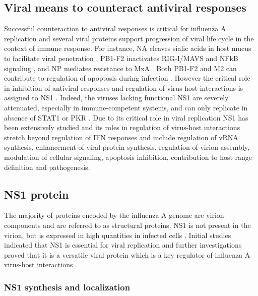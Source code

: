 		
	\subsection{Viral means to counteract antiviral responses}
	
	Successful counteraction to antiviral responses is critical for influenza A replication and several viral proteins support progression of viral life cycle in the context of immune response. For instance, \gls{NA} cleaves sialic acids in host mucus to facilitate viral penetration \parencite{Cohen2013}, \gls{PB1}-F2 inactivates \gls{RIG-I}/\gls{MAVS} and \gls{NFkB} signaling \parencite{Varga2011a, Dudek2011, Reis2013}, and \gls{NP} mediates resistance to \gls{MxA} \parencite{Dittmann2008}. Both \gls{PB1}-F2 and \gls{M2} can contribute to regulation of apoptosis during infection \parencite{Herold2012}. However the critical role in inhibition of antiviral responses and regulation of virus-host interactions is assigned to \gls{NS1} \parencite{Garcia-Sastre1998}. Indeed, the viruses lacking functional \gls{NS1} are severely attenuated, especially in immune-competent systems, and can only replicate in absence of \gls{STAT}1 or \gls{PKR} \parencite{Garcia-Sastre1998, Egorov1998, Donelan2003, Falcon2004}. Due to its critical role in viral replication \gls{NS1} has been extensively studied and its roles in regulation of virus-host interactions stretch beyond regulation of \gls{IFN} responses and include regulation of vRNA synthesis, enhancement of viral protein synthesis, regulation of virion assembly, modulation of cellular signaling, apoptosis inhibition, contribution to host range definition and pathogenesis. 
		
	\subsection{NS1 protein}
		
		The majority of proteins encoded by the influenza A genome are virion components and are referred to as structural proteins. \gls{NS1} is not present in the virion, but is expressed in high quantities in infected cells \parencite{Ritchey1976}. Initial studies indicated that \gls{NS1} is essential for viral replication \parencite{Koennecke1981} and further investigations proved that it is a versatile viral protein which is a key regulator of influenza A virus-host interactions \parencite{Ayllon2015}.
		
		\subsubsection{NS1 synthesis and localization}
		
